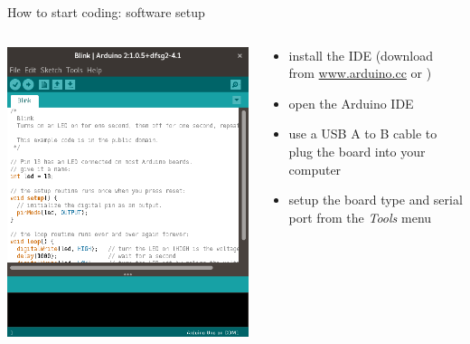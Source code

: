 \documentclass[compress]{beamer}
\begin{document}
\begin{frame}{How to start coding: software setup}
    \begin{columns}
        \begin{column}{0.5\linewidth}
            \begin{center}
                \includegraphics[width=0.9\linewidth]{arduino-ide}
            \end{center}
        \end{column}
        \begin{column}{0.5\linewidth}
            \begin{itemize}
                \item install the IDE (download from \url{www.arduino.cc} or
                    )
                \item open the Arduino IDE
                \item use a USB A to B cable to plug the board into your
                    computer
                \item setup the board type and serial port from the
                    \emph{Tools} menu
            \end{itemize}
        \end{column}
    \end{columns}
\end{frame}
\end{document}
